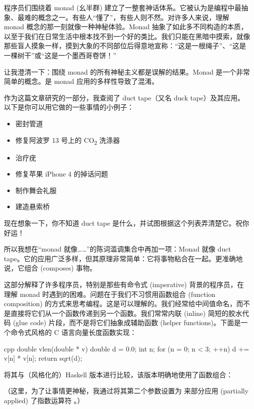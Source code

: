 
\lettrine[lhang=0.17]{程}{序员们围绕着} monad (幺半群) 建立了一整套神话体系。它被认为是编程中最抽象、最难的概念之一。有些人“懂了”，有些人则不然。对许多人来说，理解 monad 概念的那一刻就像一种神秘体验。Monad 抽象了如此多不同构造的本质，以至于我们在日常生活中根本找不到一个好的类比。我们只能在黑暗中摸索，就像那些盲人摸象一样，摸到大象的不同部位后得意地宣称：“这是一根绳子”、“这是一棵树干”或“这是一个墨西哥卷饼！”

让我澄清一下：围绕 monad 的所有神秘主义都是误解的结果。Monad 是一个非常简单的概念。是 monad 应用的多样性导致了混淆。

作为这篇文章研究的一部分，我查阅了 duct tape（又名 duck tape）及其应用。以下是你可以用它做的一些事情的小例子：

\begin{itemize}
  \tightlist
  \item
        密封管道
  \item
        修复阿波罗 13 号上的 CO\textsubscript{2} 洗涤器
  \item
        治疗疣
  \item
        修复苹果 iPhone 4 的掉话问题
  \item
        制作舞会礼服
  \item
        建造悬索桥
\end{itemize}

\noindent
现在想象一下，你不知道 duct tape 是什么，并试图根据这个列表弄清楚它。祝你好运！

所以我想在“monad 就像……”的陈词滥调集合中再加一项：Monad 就像 duct tape。它的应用广泛多样，但其原理非常简单：它将事物粘合在一起。更准确地说，它组合 (composes) 事物。

这部分解释了许多程序员，特别是那些有命令式 (imperative) 背景的程序员，在理解 monad 时遇到的困难。问题在于我们不习惯用函数组合 (function composition) 的方式来思考编程。这是可以理解的。我们经常给中间值命名，而不是直接将它们从一个函数传递到另一个函数。我们常常内联 (inline) 简短的胶水代码 (glue code) 片段，而不是将它们抽象成辅助函数 (helper functions)。下面是一个命令式风格的 C 语言向量长度函数实现：

\begin{snip}{cpp}
double vlen(double * v) {
    double d = 0.0;
    int n;
    for (n = 0; n < 3; ++n)
        d += v[n] * v[n];
    return sqrt(d);
}
\end{snip}
将其与（风格化的）Haskell 版本进行比较，该版本明确地使用了函数组合：

（这里，为了让事情更神秘，我通过将其第二个参数设置为  来部分应用 (partially applied) 了指数运算符 \code{(\^{})}。）

